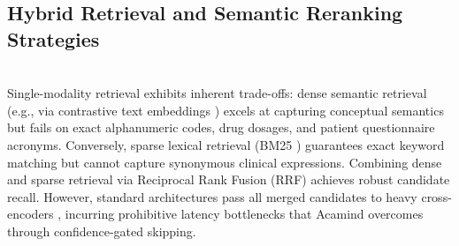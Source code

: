 \documentclass[10pt]{SPIIRAS_Proceedings}
\begin{document}
\begin{table}[H]
\centering
\caption{Comparative Architectural Analysis of RAG Paradigms and Acamind}
\label{tab:rag_comparison}
\end{table}

\subsection{Hybrid Retrieval and Semantic Reranking Strategies}~\\
\hspace*{\parindent}Single-modality retrieval exhibits inherent trade-offs: dense semantic retrieval (e.g., via contrastive text embeddings \cite{wang2022text}) excels at capturing conceptual semantics but fails on exact alphanumeric codes, drug dosages, and patient questionnaire acronyms. Conversely, sparse lexical retrieval (BM25 \cite{robertson2009probabilistic}) guarantees exact keyword matching but cannot capture synonymous clinical expressions. Combining dense and sparse retrieval via Reciprocal Rank Fusion (RRF) \cite{cormack2009reciprocal} achieves robust candidate recall. However, standard architectures pass all merged candidates to heavy cross-encoders \cite{chen2024bge,xiao2023cpack}, incurring prohibitive latency bottlenecks that Acamind overcomes through confidence-gated skipping.
\end{document}
